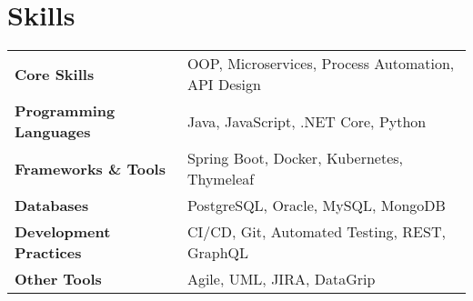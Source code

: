\section{\textbf{Skills}}
\begin{tabularx}{\linewidth}{@{}l X@{}}
    \textbf{Core Skills} & \normalsize{OOP, Microservices, Process Automation, API Design} \\
    \textbf{Programming Languages} & \normalsize{Java, JavaScript, .NET Core, Python} \\
    \textbf{Frameworks \& Tools} & \normalsize{Spring Boot, Docker, Kubernetes, Thymeleaf} \\
    \textbf{Databases} & \normalsize{PostgreSQL, Oracle, MySQL, MongoDB} \\
    \textbf{Development Practices} & \normalsize{CI/CD, Git, Automated Testing, REST, GraphQL} \\
    \textbf{Other Tools} & \normalsize{Agile, UML, JIRA, DataGrip} \\
\end{tabularx}
